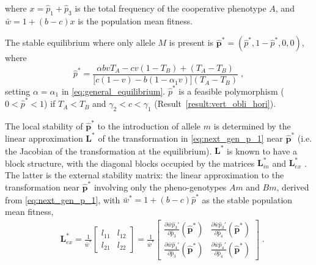 \documentclass[12pt]{extarticle}
\let\vec\mathbf
\newcommand{\cl}{\mathbf{L}}
\begin{document}
where $x=\hat{p}_1+\hat{p}_3$ is the total frequency of the cooperative phenotype $A$, and $\bar{w} = 1 + (b-c) x$ is the population mean fitness.%

The stable equilibrium where only allele $M$ is present is  $\vec{\hat{p}^*} = (\hat{p}^*, 1-\hat{p}^*, 0, 0)$, where
\begin{equation} \label{eq:p_tilde_star_alpha_1}
\hat{p}^*=
\frac{\alpha bvT_A - cv(1-T_B) + (T_A-T_B)}{\big[c(1-v) - b (1-\alpha_1 v)\big] (T_A-T_B)} \;,
\end{equation}
setting $\alpha=\alpha_1$ in \autoref{eq:general_equilibrium}.
$\hat{p}^*$ is a feasible polymorphism ($0 < \hat{p}^* < 1$) if $T_A<T_B$ and $\gamma_2<c<\gamma_1$ (Result~\ref{result:vert_obli_hori}).

The local stability of $\vec{\hat{p}^*}$ to the introduction of allele $m$ is determined by the linear approximation $\cl^*$ of the transformation in \autoref{eq:next_gen_p_1} near $\vec{\hat{p}^*}$ (i.e. the Jacobian of the transformation at the equilibrium).
$\cl^*$ is known to have a block structure, with the diagonal blocks occupied by the matrices $\cl^*_{in}$ and $\cl^*_{ex}$ \citep{Liberman1986modifiers,Altenberg2017} .
The latter is the external stability matrix: the linear approximation to the transformation near $\vec{\hat{p}^*}$ involving only the pheno-genotypes $Am$ and $Bm$, derived from \autoref{eq:next_gen_p_1}, with $\bar{w}^*=1+(b-c)\hat{p}^*$ as the stable population mean fitness,
\begin{equation} \label{eq:external_stability_matrix}
\begin{aligned}
&\cl^*_{ex} = 
 \frac{1}{\bar{w}^*} \begin{bmatrix}
	 l_{1 1} &
	 l_{1 2} \\
	 l_{2 1} &
	 l_{2 2} 
\end{bmatrix} = 
\frac{1}{\bar{w}^*} \begin{bmatrix}
\frac{\partial\bar{w}\hat{p}_3'}{\partial \hat{p}_3}(\vec{\hat{p}}^*) &
\frac{\partial\bar{w}\hat{p}_3'}{\partial \hat{p}_4}(\vec{\hat{p}}^*) \\
\frac{\partial\bar{w}\hat{p}_4'}{\partial \hat{p}_3}(\vec{\hat{p}}^*) &
\frac{\partial\bar{w}\hat{p}_4'}{\partial \hat{p}_4}(\vec{\hat{p}}^*) 
\end{bmatrix} \;.
\end{aligned}
\end{equation}
\end{document}
